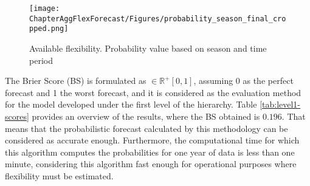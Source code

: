 \begin{figure}[htbp]
\centerline{\texttt{[image: ChapterAggFlexForecast/Figures/probability\_season\_final\_cropped.png]}}
\caption{Available flexibility. Probability value based on season and time period}
\label{fig:LEVEL1-P_YEAR}
\end{figure}

The Brier Score (BS) is formulated as $\in \mathbb{R}^+ [0,1]$, assuming 0 as the perfect forecast and 1 the worst forecast, and it is considered as the evaluation method for the model developed under the first level of the hierarchy. Table \ref{tab:level1-scores} provides an overview of the results, where the BS obtained is $0.196$. That means that the probabilistic forecast calculated by this methodology can be considered as accurate enough. Furthermore, the computational time for which this algorithm computes the probabilities for one year of data is less than one minute, considering this algorithm fast enough for operational purposes where flexibility must be estimated. 


\begin{table}[htbp]
\centering
\caption{Results of model evaluation procedure for the climatology model in the first level of the hierarchy, using the Brier Score (BS) as a performance score.}
\vspace*{3mm}
\label{tab:level1-scores}
\end{table}

